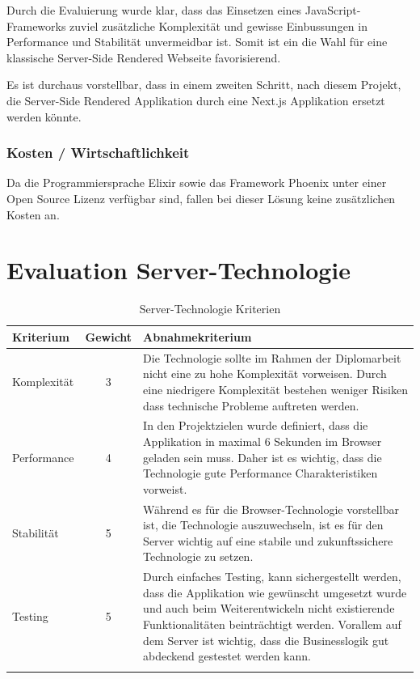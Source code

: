 Durch die Evaluierung wurde klar, dass das Einsetzen eines JavaScript-Frameworks
zuviel zusätzliche Komplexität und gewisse Einbussungen in Performance und Stabilität
unvermeidbar ist. Somit ist ein die Wahl für eine klassische Server-Side Rendered
Webseite favorisierend.

Es ist durchaus vorstellbar, dass in einem zweiten Schritt, nach diesem Projekt,
die Server-Side Rendered Applikation durch eine Next.js Applikation ersetzt werden
könnte.

\subsubsection{Kosten / Wirtschaftlichkeit}

Da die Programmiersprache Elixir sowie das Framework Phoenix unter einer
Open Source Lizenz verfügbar sind, fallen bei dieser Lösung keine zusätzlichen
Kosten an.

\clearpage
\section{Evaluation Server-Technologie}\label{evaluation-server-technologie}



\begin{longtable}[]{@{}p{2cm}cp{10cm}@{}}
  \toprule
  \textbf{Kriterium} & \textbf{Gewicht} & \textbf{Abnahmekriterium}\tabularnewline
  \midrule
  \endhead
  Komplexität        & 3                & Die Technologie sollte im Rahmen der Diplomarbeit nicht eine zu hohe Komplexität vorweisen. Durch eine niedrigere Komplexität bestehen weniger Risiken dass technische Probleme auftreten werden.\tabularnewline
  \midrule
  Performance        & 4                & In den Projektzielen wurde definiert, dass die Applikation in maximal 6 Sekunden im Browser geladen sein muss. Daher ist es wichtig, dass die Technologie gute Performance Charakteristiken vorweist.\tabularnewline
  \midrule
  Stabilität         & 5                & Während es für die Browser-Technologie vorstellbar ist, die Technologie auszuwechseln, ist es für den Server wichtig auf eine stabile und zukunftssichere Technologie zu setzen.\tabularnewline
  \midrule
  Testing            & 5                & Durch einfaches Testing, kann sichergestellt werden, dass die Applikation wie gewünscht umgesetzt wurde und auch beim Weiterentwickeln nicht existierende Funktionalitäten beinträchtigt werden. Vorallem auf dem Server ist wichtig, dass die Businesslogik gut abdeckend gestestet werden kann.\tabularnewline
  \bottomrule
  \caption{Server-Technologie Kriterien}
\end{longtable}

